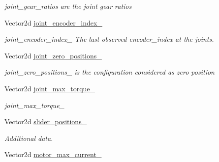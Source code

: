 \begin{DoxyCompactItemize}
\begin{DoxyCompactList}\small\item\em joint\+\_\+gear\+\_\+ratios are the joint gear ratios \end{DoxyCompactList}\item 
Vector2d \hyperlink{classblmc__robots_1_1SingleLeg_a7b56a40d83103f77cd01915c6ee29367}{joint\+\_\+encoder\+\_\+index\+\_\+}\hypertarget{classblmc__robots_1_1SingleLeg_a7b56a40d83103f77cd01915c6ee29367}{}\label{classblmc__robots_1_1SingleLeg_a7b56a40d83103f77cd01915c6ee29367}

\begin{DoxyCompactList}\small\item\em joint\+\_\+encoder\+\_\+index\+\_\+ The last observed encoder\+\_\+index at the joints. \end{DoxyCompactList}\item 
Vector2d \hyperlink{classblmc__robots_1_1SingleLeg_a757c6d5527c7914bdb30b8ee96a8df8d}{joint\+\_\+zero\+\_\+positions\+\_\+}\hypertarget{classblmc__robots_1_1SingleLeg_a757c6d5527c7914bdb30b8ee96a8df8d}{}\label{classblmc__robots_1_1SingleLeg_a757c6d5527c7914bdb30b8ee96a8df8d}

\begin{DoxyCompactList}\small\item\em joint\+\_\+zero\+\_\+positions\+\_\+ is the configuration considered as zero position \end{DoxyCompactList}\item 
Vector2d \hyperlink{classblmc__robots_1_1SingleLeg_afb76b1c90cce0d805aa4baaa9b4de797}{joint\+\_\+max\+\_\+torque\+\_\+}\hypertarget{classblmc__robots_1_1SingleLeg_afb76b1c90cce0d805aa4baaa9b4de797}{}\label{classblmc__robots_1_1SingleLeg_afb76b1c90cce0d805aa4baaa9b4de797}

\begin{DoxyCompactList}\small\item\em joint\+\_\+max\+\_\+torque\+\_\+ \end{DoxyCompactList}\item 
Vector2d \hyperlink{classblmc__robots_1_1SingleLeg_af841dc84f18c70c85bb0e19dd88da85f}{slider\+\_\+positions\+\_\+}
\begin{DoxyCompactList}\small\item\em Additional data. \end{DoxyCompactList}\item 
Vector2d \hyperlink{classblmc__robots_1_1SingleLeg_a4f8e64b30e001d4b1c74595841c26735}{motor\+\_\+max\+\_\+current\+\_\+}\hypertarget{classblmc__robots_1_1SingleLeg_a4f8e64b30e001d4b1c74595841c26735}{}\label{classblmc__robots_1_1SingleLeg_a4f8e64b30e001d4b1c74595841c26735}


\end{DoxyCompactItemize}
